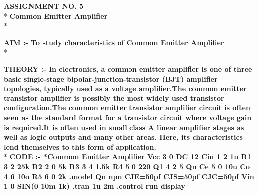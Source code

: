 \documentclass{article}
\begin{document}
\begin{center}
\Large{{\bf\textcolor{rosewood}{ASSIGNMENT NO. 5}}}\\*
\vspace{2mm}
\large{{\bf \textcolor{rosewood}{Common Emitter Amplifier}}}\\*
\vspace{5mm}
\end{center}
\begin{flushleft}
\large{{\bf\textcolor{rosewood}{AIM :-} To study characteristics of Common Emitter Amplifier}}\vspace{5mm}\\*

\large{{\bf\textcolor{rosewood}{THEORY :-}
In electronics, a common emitter amplifier is one of three basic single-stage bipolar-junction-transistor (BJT) amplifier topologies, typically used as a voltage amplifier.The common emitter transistor amplifier is possibly the most widely used transistor configuration.The common emitter transistor amplifier circuit is often seen as the standard format for a transistor circuit where voltage gain is required.It is often used in small class A linear amplifier stages as well as logic outputs and many other areas. Here, its characteristics lend themselves to this form of application.}}\vspace{5mm}\\*
\large{{\bf\textcolor{rosewood}{CODE :-}
*Common Emitter Amplifier \newline
Vcc 3 0 DC 12 \newline
Cin 1 2 1u \newline
R1 3 2 25k \newline
R2 2 0 5k \newline
R3 3 4 1.5k \newline
R4 5 0 220 \newline
Q1 4 2 5 Qn \newline
Ce 5 0 10u \newline
Co 4 6 10o \newline
R5 6 0 2k \newline
\newline
.model Qn npn CJE=50pf CJS=50pf CJC=50pf \newline
\newline
Vin 1 0 SIN(0 10m 1k) \newline
.tran 1u 2m \newline
.control \newline
run \newline
display \newline
}}
\end{flushleft}
\end{document}
